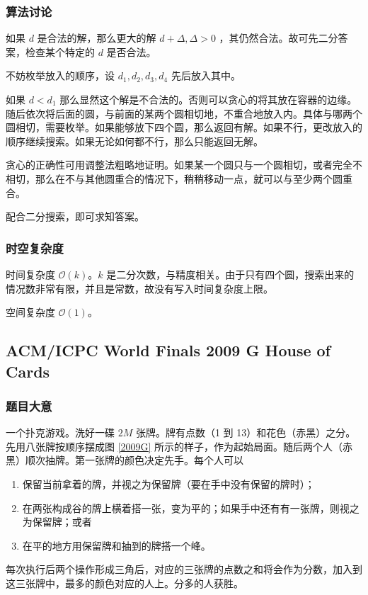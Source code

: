 			\subsubsection{算法讨论}
				如果 $d$ 是合法的解，那么更大的解 $d + \Delta, \Delta > 0$ ，其仍然合法。故可先二分答案，检查某个特定的 $d$ 是否合法。	
				
				不妨枚举放入的顺序，设 $d_1, d_2, d_3, d_4 $ 先后放入其中。
				
				如果 $d < d_1$ 那么显然这个解是不合法的。否则可以贪心的将其放在容器的边缘。随后依次将后面的圆，与前面的某两个圆相切地，不重合地放入内。具体与哪两个圆相切，需要枚举。如果能够放下四个圆，那么返回有解。如果不行，更改放入的顺序继续搜索。如果无论如何都不行，那么只能返回无解。
				
				贪心的正确性可用调整法粗略地证明。如果某一个圆只与一个圆相切，或者完全不相切，那么在不与其他圆重合的情况下，稍稍移动一点，就可以与至少两个圆重合。
				
				配合二分搜索，即可求知答案。
			\subsubsection{时空复杂度}
				
				时间复杂度 $\mathcal{O}\left(k\right)$。$k$ 是二分次数，与精度相关。由于只有四个圆，搜索出来的情况数非常有限，并且是常数，故没有写入时间复杂度上限。
					
				空间复杂度 $\mathcal{O}\left(1\right)$。
		\newpage
		\subsection{ACM/ICPC World Finals 2009 G House of Cards}
			\subsubsection{题目大意}
				一个扑克游戏。洗好一碟 $2 M$ 张牌。牌有点数（1 到 13）和花色（赤黑）之分。先用八张牌按顺序摆成图 \ref{2009G} 所示的样子，作为起始局面。随后两个人（赤黑）顺次抽牌。第一张牌的颜色决定先手。每个人可以
				\begin{enumerate}
					\item 保留当前拿着的牌，并视之为保留牌（要在手中没有保留的牌时）；
					\item 在两张构成谷的牌上横着搭一张，变为平的；如果手中还有有一张牌，则视之为保留牌；或者
					\item  在平的地方用保留牌和抽到的牌搭一个峰。
				\end{enumerate}
				每次执行后两个操作形成三角后，对应的三张牌的点数之和将会作为分数，加入到这三张牌中，最多的颜色对应的人上。分多的人获胜。
				
